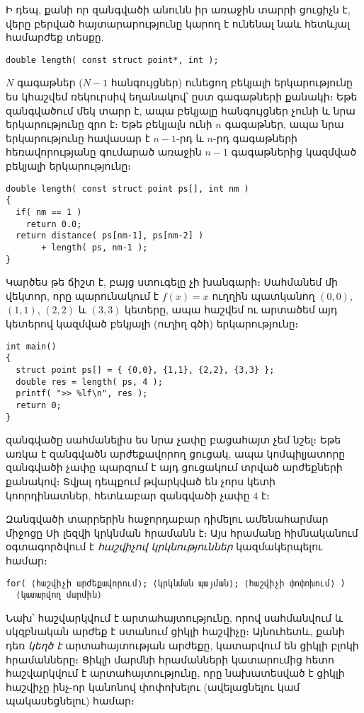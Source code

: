 Ի դեպ, քանի որ զանգվածի անունն իր առաջին տարրի ցուցիչն է, վերը բերված
հայտարարությունը կարող է ունենալ նաև հետևյալ համարժեք տեսքը.

\begin{Verbatim}
double length( const struct point*, int );
\end{Verbatim}

\(N\) գագաթներ (\(N-1\) հանգույցներ) ունեցող բեկյալի երկարությունը ես
կհաշվեմ ռեկուրսիվ եղանակով՝ ըստ գագաթների քանակի։ Եթե զանգվածում մեկ
տարր է, ապա բեկյալը հանգույցներ չունի և նրա երկարությունը զրո է։ Եթե
բեկյալն ունի \(n\) գագաթներ, ապա նրա երկարությունը հավասար է \(n-1\)-րդ
և \(n\)-րդ գագաթների հեռավորությանը գումարած առաջին \(n-1\) գագաթներից
կազմված բեկյալի երկարությունը։

\begin{Verbatim}
double length( const struct point ps[], int nm )
{
  if( nm == 1 )
    return 0.0;
  return distance( ps[nm-1], ps[nm-2] )
       + length( ps, nm-1 );
}
\end{Verbatim}

Կարծես թե ճիշտ է, բայց ստուգելը չի խանգարի։ Սահմանեմ մի վեկտոր, որը
պարունակում է \(f(x)=x\) ուղղին պատկանող \((0,0)\), \((1,1)\),
\((2,2)\) և \((3,3)\) կետերը, ապա հաշվեմ ու արտածեմ այդ կետերով կազմված
բեկյալի (ուղիղ գծի) երկարությունը։

\begin{Verbatim}
int main()
{
  struct point ps[] = { {0,0}, {1,1}, {2,2}, {3,3} };
  double res = length( ps, 4 );
  printf( ">> %lf\n", res );
  return 0;
}
\end{Verbatim}

 զանգվածը սահմանելիս ես նրա չափը բացահայտ չեմ նշել։ Եթե
առկա է զանգվածն արժեքավորող ցուցակ, ապա կոմպիլյատորը զանգվածի չափը պարզում
է այդ ցուցակում տրված արժեքների քանակով։ Տվյալ դեպքում թվարկված են չորս
կետի կոորդինատներ, հետևաբար  զանգվածի չափը \(4\) է։


Զանգվածի տարրերին հաջորդաբար դիմելու ամենահարմար միջոցը Սի լեզվի 
կրկնման հրամանն է։ Այս  հրամանը հիմնականում օգտագործվում է
\emph{հաշվիչով կրկնություններ} կազմակերպելու համար։

\begin{Verbatim}
for( ⟨հաշվիչի արժեքավորում⟩; ⟨կրկնման պայման⟩; ⟨հաշվիչի փոփոխում⟩ )
  ⟨կատարվող մարմին⟩
\end{Verbatim}

Նախ՝ հաշվարկվում է  արտահայտությունը, որով
սահմանվում և սկզբնական արժեք է ստանում ցիկլի հաշվիչը։ Այնուհետև, քանի
դեռ \emph{կեղծ է}  արտահայտության արժեքը, կատարվում
են ցիկլի  բլոկի հրամանները։ Ցիկլի մարմնի հրամանների
կատարումից հետո հաշվարկվում է  արտահայտությունը,
որը նախատեսված է ցիկլի հաշվիչը ինչ-որ կանոնով փոփոխելու (ավելացնելու կամ
պակասեցնելու) համար։

